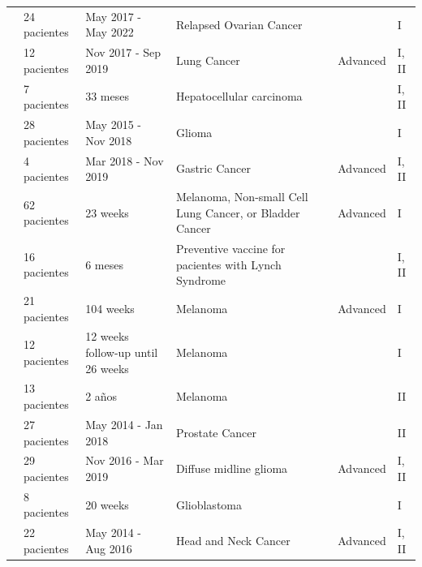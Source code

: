 \begin{table}[h]
{{\begin{tabular}{p{2cm}p{1.8cm}p{2cm}p{4.5cm}p{1.5cm}p{1cm}}
				\cite{rocconi2022proof} & 24 pacientes  &  May  2017 - May  2022 & Relapsed Ovarian Cancer & & I\\
				
				\cite{cheng2021bertmhc} & 12 pacientes & Nov 2017 - Sep 2019 & Lung Cancer & Advanced & I, II \\
				
				\cite{cai2021personalized} & 7 pacientes & 33 meses & Hepatocellular carcinoma & & I, II \\
				
				\cite{platten2021vaccine} & 28 pacientes & May 2015 - Nov 2018 & Glioma & & I \\
				
				
				\cite{cafri2020mrna} & 4 pacientes & Mar 2018 - Nov 2019 & Gastric Cancer & Advanced & I, II \\
				
				
				
				
				
				
				\cite{ott2020phase} & 62 pacientes & 23 weeks & Melanoma, Non-small Cell Lung Cancer, or Bladder Cancer & Advanced & I \\
				
				
				\cite{kloor2020frameshift} & 16 pacientes & 6 meses & Preventive vaccine for pacientes with Lynch Syndrome  & & I, II \\
				
				
				
				\cite{poran2020combined} & 21 pacientes & 104 weeks & Melanoma & Advanced & I \\
				
				\cite{engelhard2020mhc} & 12 pacientes & 12 weeks follow-up until 26 weeks & Melanoma & & I \\
				
				\cite{podaza2020evaluation} & 13 pacientes & 2 años & Melanoma & & II \\
				
				\cite{sater2020neoadjuvant} & 27 pacientes & May 2014 - Jan 2018 & Prostate Cancer & & II \\ 
				
				\cite{mueller2022mass} & 29 pacientes & Nov 2016 - Mar 2019 & Diffuse midline glioma & Advanced & I, II \\
				
				\cite{keskin2019neoantigen} & 8 pacientes & 20 weeks & Glioblastoma & & I \\
				
				
				\cite{aggarwal2019immunotherapy} & 22 pacientes & May 2014 - Aug 2016 & Head and Neck Cancer & Advanced & I, II \\
				

\end{tabular}}}
\end{table}
